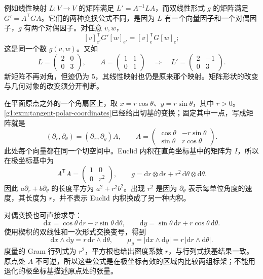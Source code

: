 例如线性映射 \(L:V\to V\) 的矩阵满足 \(L'=A^{-1}LA\)，而双线性形式 \(g\) 的矩阵满足 \(G'=A^{\mathsf T}GA\)。它们的两种变换公式不同，是因为 \(L\) 有一个向量因子和一个对偶因子，\(g\) 有两个对偶因子。对任意 \(v,w\)，
\[
	[v]_{e'}^{\mathsf T}G'[w]_{e'}
	=[v]_e^{\mathsf T}G[w]_e;
\]
这是同一个数 \(g(v,w)\)。又如
\[
	L=\begin{pmatrix}2&0\\0&3\end{pmatrix},\qquad
	A=\begin{pmatrix}1&1\\0&1\end{pmatrix}
	\quad\Longrightarrow\quad
	L'=\begin{pmatrix}2&-1\\0&3\end{pmatrix}.
\]
新矩阵不再对角，但迹仍为 \(5\)，其线性映射也仍是原来那个映射。矩阵形状的改变与几何对象的改变须分开判断。

\begin{example}
	\label{g1:exm:tensor-polar-components}
	在平面原点之外的一个角扇区上，取 \(x=r\cos\theta\)、\(y=r\sin\theta\)，其中 \(r>0\)。\cref{g1:exm:tangent-polar-coordinates}已经给出切基的变换；固定其中一点，写成矩阵就是
	\[
		(\partial_r,\partial_\theta)=(\partial_x,\partial_y)A,\qquad
		A=\begin{pmatrix}\cos\theta&-r\sin\theta\\ \sin\theta&r\cos\theta\end{pmatrix}.
	\]
	此处每个向量都在同一个切空间中。Euclid 内积在直角坐标基中的矩阵为 \(I\)，所以在极坐标基中为
	\[
		A^{\mathsf T}A=\begin{pmatrix}1&0\\0&r^2\end{pmatrix},\qquad
		g=\mathrm{d}r\otimes\mathrm{d}r+r^2\,\mathrm{d}\theta\otimes\mathrm{d}\theta.
	\]
	因此 \(a\partial_r+b\partial_\theta\) 的长度平方为 \(a^2+r^2b^2\)。出现 \(r^2\) 是因为 \(\partial_\theta\) 表示每单位角度的速度，其长度为 \(r\)，并不表示 Euclid 内积换成了另一种内积。

	对偶变换也可直接求导：
	\[
		\mathrm{d}x=\cos\theta\,\mathrm{d}r-r\sin\theta\,\mathrm{d}\theta,\qquad
		\mathrm{d}y=\sin\theta\,\mathrm{d}r+r\cos\theta\,\mathrm{d}\theta.
	\]
	使用楔积的双线性和一次形式交换变号，得到
	\[
		\mathrm{d}x\wedge\mathrm{d}y
		=r\,\mathrm{d}r\wedge\mathrm{d}\theta,\qquad
		\mu_g=|\mathrm{d}x\wedge\mathrm{d}y|
		=r\,|\mathrm{d}r\wedge\mathrm{d}\theta|.
	\]
	度量的 Gram 行列式为 \(r^2\)，平方根也给出密度系数 \(r\)，与行列式换基结果一致。原点处 \(A\) 不可逆，所以这些公式是在极坐标有效的区域内比较两组标架；不能用退化的极坐标基描述原点处的张量。
\end{example}
